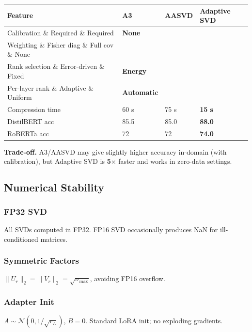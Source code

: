 \begin{table}[H]
\centering
\small
\begin{tabular}{llll}
\toprule
\textbf{Feature} & \textbf{A3} & \textbf{AASVD} & \textbf{\textbf{Adaptive SVD}} \\
\midrule
Calibration \& Required \& Required & \textbf{None} \\
Weighting \& Fisher diag \& Full cov \& None \\
Rank selection \& Error-driven \& Fixed & \textbf{Energy} \\
Per-layer rank \& Adaptive \& Uniform & \textbf{Automatic} \\
Compression time & 60 s & 75 s & \textbf{15 s} \\
DistilBERT acc & 85.5 & 85.0 & \textbf{88.0} \\
RoBERTa acc & 72 & 72 & \textbf{74.0} \\
\bottomrule
\end{tabular}
\end{table}

\textbf{Trade-off.} A3/AASVD may give slightly higher accuracy in-domain (with 
calibration), but Adaptive SVD is \textbf{5$\times$} faster and works in 
zero-data settings.

\subsection{Numerical Stability}

\subsubsection{FP32 SVD}

All SVDs computed in FP32. FP16 SVD occasionally produces NaN for 
ill-conditioned matrices.

\subsubsection{Symmetric Factors}

$\|U_r\|_2 = \|V_r\|_2 = \sqrt{\sigma_\text{max}}$, avoiding FP16 overflow.

\subsubsection{Adapter Init}

$A \sim \mathcal{N}(0, 1/\sqrt{r_L})$, $B = 0$. Standard LoRA init; no 
exploding gradients.

